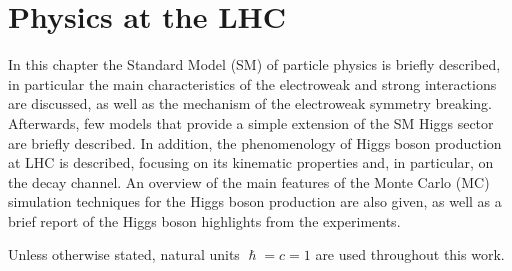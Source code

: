 \chapter{Physics at the LHC}\label{chap1}
\thispagestyle{empty}

In this chapter the Standard Model (SM) of particle physics is briefly described, in particular the main characteristics of the electroweak and strong interactions are discussed, as well as the mechanism of the electroweak symmetry breaking. Afterwards, few models that provide a simple extension of the SM Higgs sector are briefly described.
In addition, the phenomenology of Higgs boson production at LHC is described, focusing on its kinematic properties and, in particular, on the \hww decay channel. An overview of the main features of the Monte Carlo (MC) simulation techniques for the Higgs boson production are also given, as well as a brief report of the Higgs boson highlights from the experiments.

\noindent Unless otherwise stated, natural units $\hslash=c=1$ are used throughout this work.


%
%
%




